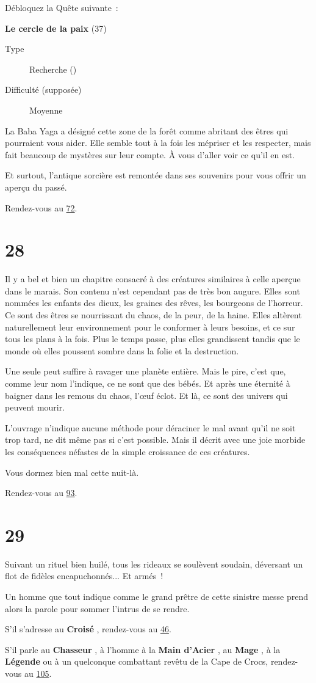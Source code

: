 \documentclass{report}
\newcommand{\gsection}[1]{
    \section{#1}
    \label{section-#1}
}
\newcommand{\glink}[1]{\hyperref[section-#1]{#1}}
\newcommand{\quest}[5]{
    \begin{mdframed}[innertopmargin=0.5cm,innerbottommargin=0.5cm]
        \begin{center}
            \textbf{#1} (#2)
        \end{center}
        \begin{description}
            \item[Type] #3
            \item[Difficulté (supposée)] #4
        \end{description}
        #5
    \end{mdframed}
}
\newcommand{\hero}[1]{
    \textbf{#1}
}
\begin{document}
Débloquez la Quête suivante :
\clearpage

\quest{Le cercle de la paix}{37}{Recherche (\caduceus)}{Moyenne}{
La Baba Yaga a désigné cette zone de la forêt comme abritant des êtres qui pourraient vous aider. Elle semble tout à la fois les mépriser et les respecter, mais fait beaucoup de mystères sur leur compte. À vous d'aller voir ce qu'il en est.
}

Et surtout, l'antique sorcière est remontée dans ses souvenirs pour vous offrir un aperçu du passé.

Rendez-vous au \glink{72}.

\gsection{28}

Il y a bel et bien un chapitre consacré à des créatures similaires à celle aperçue dans le marais. Son contenu n'est cependant pas de très bon augure. Elles sont nommées les enfants des dieux, les graines des rêves, les bourgeons de l'horreur. Ce sont des êtres se nourrissant du chaos, de la peur, de la haine. Elles altèrent naturellement leur environnement pour le conformer à leurs besoins, et ce sur tous les plans à la fois. Plus le temps passe, plus elles grandissent tandis que le monde où elles poussent sombre dans la folie et la destruction.

Une seule peut suffire à ravager une planète entière. Mais le pire, c'est que, comme leur nom l'indique, ce ne sont que des bébés. Et après une éternité à baigner dans les remous du chaos, l’œuf éclot. Et là, ce sont des univers qui peuvent mourir.

L'ouvrage n'indique aucune méthode pour déraciner le mal avant qu'il ne soit trop tard, ne dit même pas si c'est possible. Mais il décrit avec une joie morbide les conséquences néfastes de la simple croissance de ces créatures.

Vous dormez bien mal cette nuit-là.

Rendez-vous au \glink{93}.

\gsection{29}

Suivant un rituel bien huilé, tous les rideaux se soulèvent soudain, déversant un flot de fidèles encapuchonnés... Et armés !

Un homme que tout indique comme le grand prêtre de cette sinistre messe prend alors la parole pour sommer l'intrus de se rendre.

S'il s'adresse au \hero{Croisé}, rendez-vous au \glink{46}.

S'il parle au \hero{Chasseur}, à l'homme à la \hero{Main d'Acier}, au \hero{Mage}, à la \hero{Légende} ou à un quelconque  combattant revêtu de la Cape de Crocs, rendez-vous au \glink{105}.
\end{document}

